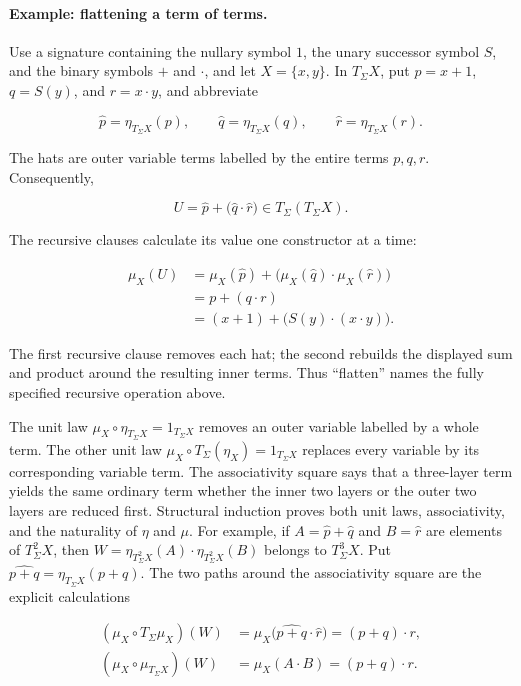 \documentclass[11pt]{article}
\begin{document}
\paragraph{Example: flattening a term of terms.}
Use a signature containing the nullary symbol \(1\), the unary successor
symbol \(S\), and the binary symbols \(+\) and \(\cdot\), and let
\(X=\{x,y\}\). In
\(T_\Sigma X\), put \(p=x+1\), \(q=S(y)\), and \(r=x\cdot y\), and abbreviate

\[
\widehat p=\eta_{T_\Sigma X}(p),\qquad
\widehat q=\eta_{T_\Sigma X}(q),\qquad
\widehat r=\eta_{T_\Sigma X}(r).
\]

The hats are outer variable terms labelled by the entire terms \(p,q,r\).
Consequently,

\[
U=\widehat p+\bigl(\widehat q\cdot\widehat r\bigr)
\in T_\Sigma(T_\Sigma X).
\]

The recursive clauses calculate its value one constructor at a time:

\[
\begin{aligned}
\mu_X(U)
&=\mu_X(\widehat p)
  +\bigl(\mu_X(\widehat q)\cdot\mu_X(\widehat r)\bigr)\\
&=p+(q\cdot r)\\
&=(x+1)+\bigl(S(y)\cdot(x\cdot y)\bigr).
\end{aligned}
\]

The first recursive clause removes each hat; the second rebuilds the displayed
sum and product around the resulting inner terms. Thus ``flatten'' names the
fully specified recursive operation above.

The unit law \(\mu_X\circ\eta_{T_\Sigma X}=1_{T_\Sigma X}\) removes an outer
variable labelled by a whole term. The other unit law
\(\mu_X\circ T_\Sigma(\eta_X)=1_{T_\Sigma X}\) replaces every variable by
its corresponding variable term. The associativity square says that a
three-layer term yields the same ordinary term whether the inner two layers or
the outer two layers are reduced first. Structural induction proves both unit
laws, associativity, and the naturality of \(\eta\) and \(\mu\). For example, if
\(A=\widehat p+\widehat q\) and \(B=\widehat r\) are elements of
\(T_\Sigma^2X\), then
\(W=\eta_{T_\Sigma^2X}(A)\cdot\eta_{T_\Sigma^2X}(B)\) belongs to
\(T_\Sigma^3X\). Put
\(\widehat{p+q}=\eta_{T_\Sigma X}(p+q)\). The two paths around the
associativity square are the explicit calculations

\[
\begin{aligned}
(\mu_X\circ T_\Sigma\mu_X)(W)
  &=\mu_X\bigl(\widehat{p+q}\cdot\widehat r\bigr)
   =(p+q)\cdot r,\\
(\mu_X\circ\mu_{T_\Sigma X})(W)
  &=\mu_X(A\cdot B)
   =(p+q)\cdot r.
\end{aligned}
\]
\end{document}
